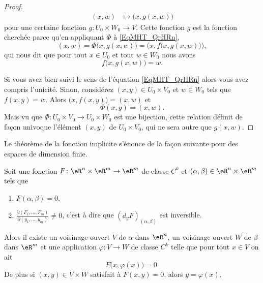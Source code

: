 \begin{proof}
\begin{equation}
\begin{aligned}
            (x,w)&\mapsto \big( x,g(x,w) \big) 
        \end{aligned}
    \end{equation}
    pour une certaine fonction \( g\colon U_0\times W_0\to V\). Cette fonction \( g\) est la fonction cherchée parce qu'en appliquant \( \Phi\) à \eqref{EqMHT_QrHRn}, 
    \begin{equation}
        (x,w)=\Phi\big( x,g(x,w) \big)=\Big( x,f\big( x,g(x,w) \big) \Big),
    \end{equation}
    qui nous dit que pour tout \( x\in U_0\) et tout \( w\in W_0\) nous avons
    \begin{equation}
        f\big( x,g(x,w) \big)=w.
    \end{equation}

    Si vous avez bien suivi le sens de l'équation \eqref{EqMHT_QrHRn} alors vous avez compris l'unicité. Sinon, considérez \( (x,y)\in U_0\times V_0\) et \( w\in W_0\) tels que \( f(x,y)=w\). Alors \( \big( x,f(x,y) \big)=(x,w)\) et 
    \begin{equation}
        \Phi(x,y)=(x,w).
    \end{equation}
    Mais vu que \( \Phi\colon U_0\times V_0\to U_0\times W_0\) est une bijection, cette relation définit de façon univoque l'élément \( (x,y)\) de \( U_0\times V_0\), qui ne sera autre que \( g(x,w)\).
\end{proof}

Le théorème de la fonction implicite s'énonce de la façon suivante pour des espaces de dimension finie.
\begin{theorem}   \label{ThoRYN_jvZrZ}
    Soit une fonction \( F\colon \eR^n\times \eR^m\to \eR^m\) de classe \( C^k\) et \( (\alpha,\beta)\in \eR^n\times \eR^m\) tels que
    \begin{enumerate}
        \item
            \( F(\alpha,\beta)=0\),
        \item
            \( \frac{ \partial (F_1,\ldots, F_m) }{ \partial (y_1,\ldots, y_m) }\neq 0\), c'est à dire que \( (d_yF)_{(\alpha,\beta)} \) est inversible.
    \end{enumerate}
    Alors il existe un voisinage ouvert \( V\) de \( \alpha\) dans \( \eR^n\), un voisinage ouvert \( W\) de \( \beta\) dans \( \eR^m\) et une application \( \varphi\colon V\to W\) de classe \( C^k\)  telle que pour tout \( x\in V\) on ait
    \begin{equation}
        F\big( x,\varphi(x) \big)=0.
    \end{equation}
    De plus si \( (x,y)\in V\times W\) satisfait à \( F(x,y)=0\), alors \( y=\varphi(x)\).
\end{theorem}

